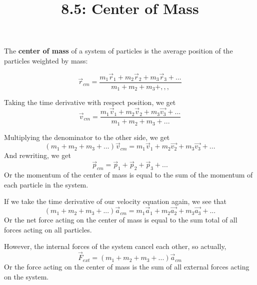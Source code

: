 \documentclass{article}
\title{8.5: Center of Mass}
\begin{document}
\maketitle
\begin{definition}
The \textbf{center of mass} of a system of particles is the average position of the particles weighted by mass:

$$\vec{r}_{cm} = \frac{m_1 \vec{r}_1 + m_2 \vec{r}_2 + m_3\vec{r}_3 + ...}{m_1 + m_2 + m_3 + ,,,}$$
\end{definition}

Taking the time derivative with respect position, we get $$\vec{v}_{cm} = \frac{m_1 \vec{v}_1 + m_2\vec{v}_2 + m_3\vec{v_3} + ...}{m_1 + m_2 + m_3 + ...}$$

Multiplying the denominator to the other side, we get $$(m_1 + m_2 + m_3 + ...)\vec{v}_{cm} = m_1\vec{v}_1 + m_2\vec{v_2} + m_3\vec{v_3} + ...$$And rewriting, we get $$\vec{p}_{cm} = \vec{p}_1 + \vec{p}_2 + \vec{p}_3 + ...$$Or the momentum of the center of mass is equal to the sum of the momentum of each particle in the system.

If we take the time derivative of our velocity equation again, we see that $$(m_1 + m_2 + m_3 + ...)\vec{a}_{cm} = m_1\vec{a}_1 + m_2\vec{a_2} + m_3\vec{a_3} + ...$$Or the net force acting on the center of mass is equal to the sum total of all forces acting on all particles.

However, the internal forces of the system cancel each other, so actually, $$\vec{F}_{ext} = (m_1 + m_2 + m_3 + ...)\vec{a}_{cm}$$Or the force acting on the center of mass is the sum of all external forces acting on the system.
\end{document}
